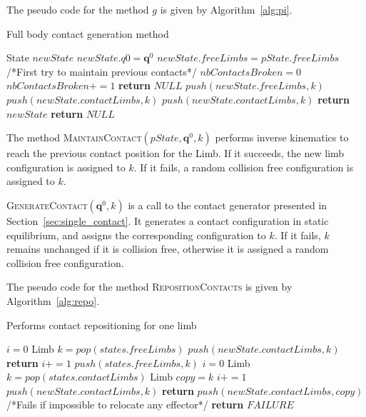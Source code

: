 The pseudo code for the method $g$ is given by Algorithm~\ref{alg:pi}.

\begin{algorithm}
\caption{Full body contact generation method} \label{interpolate}
	\begin{algorithmic}[1]
		\State State $newState$
		\State $newState.q0 = \mathbf{q}^0$
		\State $newState.freeLimbs = pState.freeLimbs$
		\State /*First try to maintain previous contacts*/
		\State $nbContactsBroken = 0$
				\State $nbContactsBroken += 1$
					\State \textbf{return} $NULL$
				\EndIf				
				\State $push(newState.freeLimbs,k)$
			\Else 					
				\State $push(newState.contactLimbs,k)$
			\EndIf
		\EndFor
				\State $push(newState.contactLimbs,k)$			
				\State \textbf{return} $newState$
			\EndIf
		\EndFor
		\State \textbf{return} $NULL$
	\EndFunction
\end{algorithmic}
\label{alg:pi}
\end{algorithm}

The method \textsc{MaintainContact}$(pState,\mathbf{q}^0,k)$ performs inverse kinematics to reach the previous contact position for the Limb.
If it succeeds, the new limb configuration is assigned to $k$. If it fails, a random collision free configuration is assigned to $k$.

\textsc{GenerateContact}$(\mathbf{q}^0,k)$ is a call to the contact generator presented in Section~\ref{sec:single_contact}. It generates a contact configuration in static equilibrium, and assigns the corresponding configuration to $k$.
If it fails, $k$ remains unchanged if it is collision free, otherwise it is assigned a random collision free configuration.


The pseudo code for the method \textsc{RepositionContacts} is given by Algorithm~\ref{alg:repo}.


\begin{algorithm}
\caption{Performs contact repositioning for one limb} \label{interpolate}
	\begin{algorithmic}[1]
		\State $i=0$
			\State Limb $k = pop(states.freeLimbs)$
				\State $push(newState.contactLimbs,k)$			
				\State \textbf{return}
			\Else
				\State $i+=1$
				\State $push(states.freeLimbs,k)$		
			\EndIf
		\EndWhile
		\State $i=0$
			\State Limb $k = pop(states.contactLimbs)$
			\State Limb $copy = k$
			\State $i+=1$
				\State $push(newState.contactLimbs,k)$			
				\State \textbf{return}
			\Else
				\State $push(newState.contactLimbs,copy)$	
			\EndIf
		\EndWhile
		/*Fails if impossible to relocate any effector*/
		\State \textbf{return} $FAILURE$
	\EndFunction
\end{algorithmic}
\label{alg:repo}
\end{algorithm}

